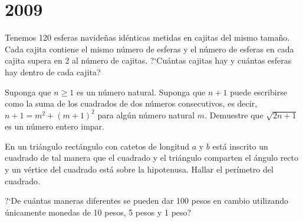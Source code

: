 \chapter{2009}
\label{cha:2009}

\begin{Problema}{1}
  Tenemos 120 esferas navide\~nas id\'enticas metidas en cajitas del
  mismo tama\~no.  Cada cajita contiene el mismo n\'umero de esferas y
  el n\'umero de esferas en cada cajita supera en 2 al n\'umero de
  cajitas. ?`Cu\'antas cajitas hay y cu\'antas esferas hay dentro de
  cada cajita?
\end{Problema}

\begin{Solucion}
  
\end{Solucion}

\begin{Problema}{2}
  Suponga que $n\geq 1$ es un n\'umero natural. Suponga que $n+1$
  puede escribirse como la suma de los cuadrados de dos n\'umeros
  consecutivos, es decir, $n+1=m^2+(m+1)^2$ para alg\'un n\'umero
  natural $m$. Demuestre que $\sqrt{2n+1}$ es un n\'umero entero
  impar.
\end{Problema}

\begin{Solucion}
  
\end{Solucion}

\begin{Problema}{3}
  En un tri\'angulo rect\'angulo con catetos de longitud $a$ y $b$
  est\'a inscrito un cuadrado de tal manera que el cuadrado y el
  tri\'angulo comparten el \'angulo recto y un v\'ertice del cuadrado
  est\'a sobre la hipotenusa. Hallar el per\'imetro del cuadrado.
\end{Problema}

\begin{Solucion}
  
\end{Solucion}

\begin{Problema}{4}
  ?`De cu\'antas maneras diferentes se pueden dar 100 pesos en cambio
  utilizando \'unicamente monedas de 10 pesos, 5 pesos y 1 peso?
\end{Problema}

\begin{Solucion}
  
\end{Solucion}

